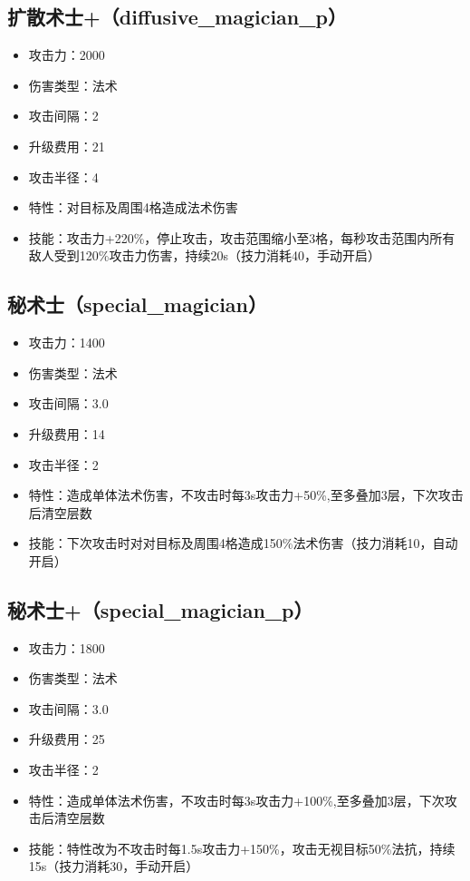 \documentclass[a4paper,12pt]{article}
\begin{document}
		\subsection{扩散术士+（diffusive\_magician\_p）}
			\begin{itemize}
				\item 攻击力：2000
				\item 伤害类型：法术
				\item 攻击间隔：2
				\item 升级费用：21
				\item 攻击半径：4
				\item 特性：对目标及周围4格造成法术伤害
				\item 技能：攻击力+220\%，停止攻击，攻击范围缩小至3格，每秒攻击范围内所有敌人受到120\%攻击力伤害，持续20s（技力消耗40，手动开启）
			\end{itemize}
		\subsection{秘术士（special\_magician）}
			\begin{itemize}
				\item 攻击力：1400
				\item 伤害类型：法术
				\item 攻击间隔：3.0
				\item 升级费用：14
				\item 攻击半径：2
				\item 特性：造成单体法术伤害，不攻击时每3s攻击力+50\%,至多叠加3层，下次攻击后清空层数
				\item 技能：下次攻击时对对目标及周围4格造成150\%法术伤害（技力消耗10，自动开启）
			\end{itemize}
		\subsection{秘术士+（special\_magician\_p）}
			\begin{itemize}
				\item 攻击力：1800
				\item 伤害类型：法术
				\item 攻击间隔：3.0
				\item 升级费用：25
				\item 攻击半径：2
				\item 特性：造成单体法术伤害，不攻击时每3s攻击力+100\%,至多叠加3层，下次攻击后清空层数
				\item 技能：特性改为不攻击时每1.5s攻击力+150\%，攻击无视目标50\%法抗，持续15s（技力消耗30，手动开启）
			\end{itemize}
\end{document}
